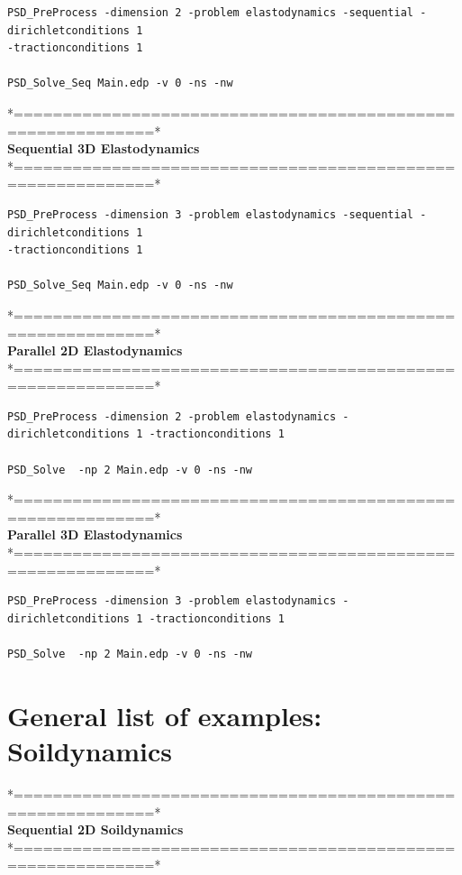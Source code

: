 \begin{lstlisting}[style=Linux]
PSD_PreProcess -dimension 2 -problem elastodynamics -sequential -dirichletconditions 1  
-tractionconditions 1 

PSD_Solve_Seq Main.edp -v 0 -ns -nw
\end{lstlisting}
*============================================================*\\
\textbf{ Sequential 3D Elastodynamics}  \\                    
*============================================================*\\

\begin{lstlisting}[style=Linux]
PSD_PreProcess -dimension 3 -problem elastodynamics -sequential -dirichletconditions 1 
-tractionconditions 1 

PSD_Solve_Seq Main.edp -v 0 -ns -nw
\end{lstlisting}
*============================================================*\\
\textbf{ Parallel 2D Elastodynamics}   \\                   
*============================================================*\\

\begin{lstlisting}[style=Linux]
PSD_PreProcess -dimension 2 -problem elastodynamics -dirichletconditions 1 -tractionconditions 1 

PSD_Solve  -np 2 Main.edp -v 0 -ns -nw
\end{lstlisting}
*============================================================*\\
\textbf{ Parallel 3D Elastodynamics } \\                    
*============================================================*\\

\begin{lstlisting}[style=Linux]
PSD_PreProcess -dimension 3 -problem elastodynamics -dirichletconditions 1 -tractionconditions 1 

PSD_Solve  -np 2 Main.edp -v 0 -ns -nw
\end{lstlisting}

\section{General list of examples: Soildynamics} 

*============================================================*\\
\textbf{ Sequential 2D Soildynamics }    \\                   
*============================================================*\\

